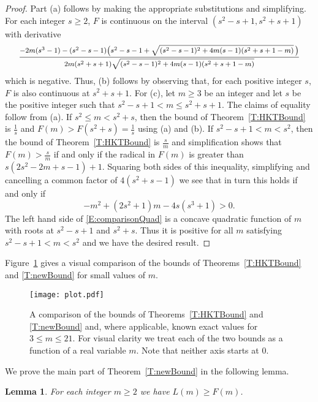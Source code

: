 \documentclass[11pt]{article}
\newtheorem{Lemma}[Theorem]{Lemma}
\theoremstyle{definition}
\renewcommand{\leq}{\leqslant}
\renewcommand{\geq}{\geqslant}
\begin{document}
\begin{proof}
Part (a) follows by making the appropriate substitutions and simplifying. For each integer $s \geq 2$, $F$ is  continuous on the interval $(s^2-s+1,s^2+s+1)$ with derivative
\[\mfrac{-2m(s^3-1)-(s^2-s-1)\bigl(s^2-s-1 + \sqrt{(s^2-s-1)^2 + 4m(s-1)(s^2+s+1-m)}\,\bigr)}
{2m(s^2+s+1)\sqrt{(s^2-s-1)^2+4m(s-1)(s^2+s+1-m)}}\]
which is negative. Thus, (b) follows by observing that, for each positive integer $s$, $F$ is also continuous at $s^2+s+1$. For (c), let $m \geq 3$ be an integer and let $s$ be the positive integer such that $s^2-s+1 < m \leq s^2+s+1$. The claims of equality follow from (a). If $s^2 \leq m < s^2+s$, then the bound of Theorem~\ref{T:HKTBound} is $\frac{1}{s}$ and $F(m) > F(s^2+s)=\frac{1}{s}$ using (a) and (b). If $s^2-s+1 < m < s^2$, then the bound of Theorem~\ref{T:HKTBound} is $\frac{s}{m}$ and simplification shows that $F(m)>\frac{s}{m}$ if and only if the radical in $F(m)$ is greater than $s(2s^2-2m+s-1)+1$. Squaring both sides of this inequality, simplifying and cancelling a common factor of $4(s^2+s-1)$ we see that in turn this holds if and only if
\begin{equation}\label{E:comparisonQuad}
-m^2 + (2s^2+1)m-4s(s^3+1) > 0.
\end{equation}
The left hand side of \eqref{E:comparisonQuad} is a concave quadratic function of $m$ with roots at $s^2-s+1$ and $s^2+s$. Thus it is positive for all $m$ satisfying $s^2-s+1 < m < s^2$ and we have the desired result.
\end{proof}

Figure~\ref{F:plot} gives a visual comparison of the bounds of Theorems~\ref{T:HKTBound} and \ref{T:newBound} for small values of $m$.

\begin{figure}[htb]
\begin{center}
\texttt{[image: plot.pdf]}
\end{center}
\caption{A comparison of the bounds of Theorems~\ref{T:HKTBound} and \ref{T:newBound} and, where applicable, known exact values for $3 \leq m \leq 21$. For visual clarity we treat each of the two bounds as a function of a real variable $m$. Note that neither axis starts at 0.}\label{F:plot}
\end{figure}




We prove the main part of Theorem~\ref{T:newBound} in the following lemma.

\begin{Lemma}\label{L:newBound}
For each integer $m \geq 2$ we have $L(m) \geq F(m)$.
\end{Lemma}
\end{document}
